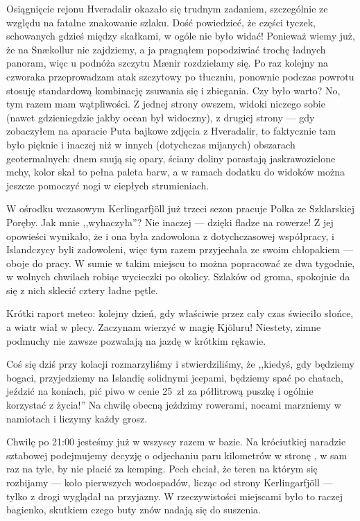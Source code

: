 Osiągnięcie rejonu Hveradalir okazało się trudnym zadaniem, szczególnie ze względu na fatalne znakowanie szlaku. Dość powiedzieć, że części tyczek, schowanych gdzieś między skałkami, w ogóle nie było widać! Ponieważ wiemy już, że na Snækollur nie zajdziemy, a ja pragnąłem popodziwiać trochę ładnych panoram, więc u podnóża szczytu Mænir rozdzielamy się. Po raz kolejny na czworaka przeprowadzam atak szczytowy po tłuczniu, ponownie podczas powrotu stosuję standardową kombinację zsuwania się i zbiegania. Czy było warto? No, tym razem mam wątpliwości. Z jednej strony owszem, widoki niczego sobie (nawet gdzieniegdzie jakby ocean był widoczny), z drugiej strony --- gdy zobaczyłem na aparacie Puta bajkowe zdjęcia z Hveradalir, to faktycznie tam było pięknie i inaczej niż w innych (dotychczas mijanych) obszarach geotermalnych: dnem snują się opary, ściany doliny porastają jaskrawozielone mchy, kolor skał to pełna paleta barw, a w ramach dodatku do widoków można jeszcze pomoczyć nogi w ciepłych strumieniach.

W ośrodku wczasowym Kerlingarfjöll już trzeci sezon pracuje Polka ze Szklarskiej Poręby. Jak mnie ,,wyhaczyła''? Nie inaczej --- dzięki fladze na rowerze! Z jej opowieści wynikało, że i ona była zadowolona z dotychczasowej współpracy, i Islandczycy byli zadowoleni, więc tym razem przyjechała ze swoim chłopakiem --- oboje do pracy. W sumie w takim miejscu to można popracować ze dwa tygodnie, w wolnych chwilach robiąc wycieczki po okolicy. Szlaków od groma, spokojnie da się z nich sklecić cztery ładne pętle.


Krótki raport meteo: kolejny dzień, gdy właściwie przez cały czas świeciło słońce, a wiatr wiał w plecy. Zaczynam wierzyć w magię Kjöluru! Niestety, zimne podmuchy nie zawsze pozwalają na jazdę w krótkim rękawie.

Coś się dziś przy kolacji rozmarzyliśmy i stwierdziliśmy, że ,,kiedyś, gdy będziemy bogaci, przyjedziemy na Islandię solidnymi jeepami, będziemy spać po chatach, jeździć na koniach, pić piwo w cenie 25~zł za półlitrową puszkę i ogólnie korzystać z życia!'' Na chwilę obecną jeździmy rowerami, nocami marzniemy w namiotach i liczymy każdy grosz.

Chwilę po 21:00 jesteśmy już w wszyscy razem w bazie. Na króciutkiej naradzie sztabowej podejmujemy decyzję o odjechaniu paru kilometrów w stronę , w sam raz na tyle, by nie płacić za kemping. Pech chciał, że teren na którym się rozbijamy --- koło pierwszych wodospadów, licząc od strony Kerlingarfjöll --- tylko z drogi wyglądał na przyjazny. W rzeczywistości miejscami było to raczej bagienko, skutkiem czego buty znów nadają się do suszenia.

